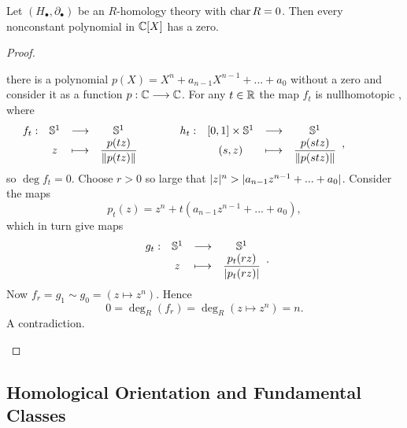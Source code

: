 	\begin{theorem}
		Let $(H_\bullet, \partial_\bullet)$ be an $R$-homology theory with $\operatorname{char} R = 0$. Then every nonconstant polynomial in $\mathbb{C}[X]$ has a zero.
	\end{theorem}
	\begin{proof}
		\begin{assume}
			there is a polynomial $p(X) = X^n + a_{n-1}X^{n-1} + ... + a_0$ without a zero and consider it as a function $p:\mathbb{C} --> \mathbb{C}$.
			For any $t \in \mathbb{R}$ the map $f_t$ is nullhomotopic , where
			\begin{equation*}
				\begin{array}{rccc}
					f_t: &\mathbb{S}^1 & \longrightarrow & \mathbb{S}^1\\
					&z & \longmapsto & \dfrac{p(tz)}{\Vert p(tz) \Vert}
				\end{array}
				\hspace{1cm}
				\begin{array}{rccc}
					h_t: &[0,1] \times \mathbb{S}^1 & \longrightarrow & \mathbb{S}^1\\
					 &(s,z) & \longmapsto & \dfrac{p(stz)}{\Vert p(stz) \Vert}
				\end{array},
				\hspace{1.5cm}
			\end{equation*}
			so $\deg f_t = 0$. Choose $r>0$ so large that $\vert z \vert^n > \vert a_{n-1}z^{n-1} + ... + a_0 \vert$. Consider the maps
			\begin{equation*}
				p_t(z) = z^n + t(a_{n-1}z^{n-1} + ... + a_0),
			\end{equation*}
			which in turn give maps
			\begin{equation*}
				\begin{array}{rccc}
					g_t: & \mathbb{S}^1 & \longrightarrow & \mathbb{S}^1\\
					& z & \longmapsto & \dfrac{p_t(r z)}{\vert p_t(rz) \vert}
				\end{array}.
			\end{equation*}
			Now $f_r = g_1 \sim g_0 = (z \mapsto z^n)$. Hence
			\begin{equation*}
				0 = \deg_R(f_r) = \deg_R(z \mapsto z^n) = n.
			\end{equation*}
			A contradiction.\vspace{-2em}
		\end{assume}
	\end{proof}

	\newpage
	\subsection{Homological Orientation and Fundamental Classes}


